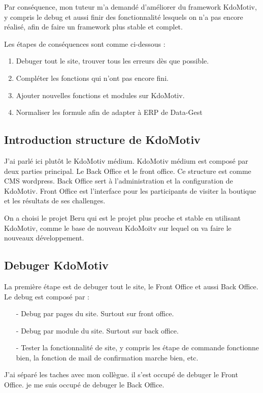 Par conséquence, mon tuteur m'a demandé d'améliorer du framework KdoMotiv, y compris le debug et aussi finir des fonctionnalité lesquels on n'a pas encore réalisé, afin de faire un framework plus stable et complet.

Les étapes de conséquences sont comme ci-dessous : 
\begin{enumerate}
\item Debuger tout le site, trouver tous les erreurs dès que possible.
\item Compléter les fonctions qui n'ont pas encore fini.
\item Ajouter nouvelles fonctions et modules sur KdoMotiv.
\item Normaliser les formule afin de adapter à ERP de Data-Gest  
\end{enumerate}

\subsection{Introduction structure de KdoMotiv}
J'ai parlé ici plutôt le KdoMotiv médium. KdoMotiv médium est composé par deux parties principal. Le Back Office et le front office. Ce structure est comme CMS wordpress. Back Office sert à l'administration et la configuration de KdoMotiv. Front Office est l'interface pour les participants de visiter la boutique et les résultats de ses challenges.

On a choisi le projet Beru qui est le projet plus proche et stable en utilisant KdoMotiv, comme le base de nouveau KdoMoitv sur lequel on va faire le nouveaux développement.



\subsection{Debuger KdoMotiv}
La première étape est de debuger tout le site, le Front Office  et aussi Back Office. 
Le debug est composé par :
\begin{itemize}
\item [-] Debug par pages du site. Surtout sur front office.
\item [-] Debug par module du site. Surtout sur back office.
\item [-] Tester la fonctionnalité de site, y compris les étape de commande fonctionne bien, la fonction de mail de confirmation marche bien, etc.
\end{itemize}

J'ai séparé les taches avec mon collègue. il s'est occupé de debuger le Front Office. je me suis occupé de debuger le Back Office.


